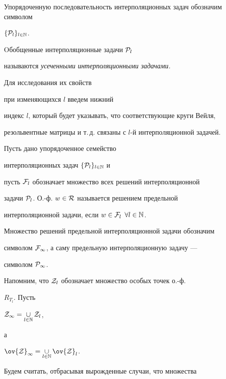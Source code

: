 Упорядоченную последовательность интерполяционных задач обозначим символом


$\{ {\cal P}_{l} \}_{l\in {\Bbb N}}$.


Oбобщенные интерполяционные задачи ${\cal P}_{l}$


называются {\em усеченными интерполяционными задачами.}


Для исследования их свойств


при изменяющихся $l$ введем нижний


индекс $l$, который будет указывать, что соответствующие круги Вейля,


резольвентные матрицы и т.\,д. связаны с $l$-й интерполяционной задачей.





\begin{defn}


Пусть дано упорядоченное семейство


интерполяционных задач $\{ {\cal P}_{l} \}_{l\in {\Bbb N}}$ и


пусть ${\cal F}_{l}$ обозначает множество всех решений интерполяционной


задачи ${\cal P}_{l}$. О.-ф. $w\in {\cal R}$ называется решением предельной


интерполяционной задачи, если $w\in {\cal F}_{l}$ $\forall l\in {\Bbb N}$.





Множество решений предельной интерполяционной задачи обозначим


символом ${\cal F}_{\infty }$, а саму предельную интерполяционную задачу ---


символом ${\cal P}_{\infty } $.


\end{defn}








Напомним, что ${\cal Z}_l$ обозначает множество особых точек о.-ф.


$R_{T_l}$. Пусть


${\cal Z}_{\infty }=\mathop{\cup}\limits_{l\in {\Bbb N}}{\cal Z}_l$,


а \linebreak


$\ov {\cal Z}_{\infty }=\mathop{\cup}\limits_{l\in {\Bbb N}}\ov{\cal Z}_l$.


Будем считать, отбрасывая вырожденные случаи, что множества


